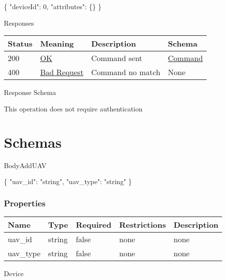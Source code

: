 \documentclass[
]{article}
\newenvironment{Shaded}{}{}
\newcommand{\DataTypeTok}[1]{\textcolor[rgb]{0.56,0.13,0.00}{#1}}
\newcommand{\DecValTok}[1]{\textcolor[rgb]{0.25,0.63,0.44}{#1}}
\newcommand{\FunctionTok}[1]{\textcolor[rgb]{0.02,0.16,0.49}{#1}}
\newcommand{\StringTok}[1]{\textcolor[rgb]{0.25,0.44,0.63}{#1}}
\begin{document}
\begin{Shaded}
\begin{Highlighting}[]
\FunctionTok{\{}
  \DataTypeTok{"deviceId"}\FunctionTok{:} \DecValTok{0}\FunctionTok{,}
  \DataTypeTok{"attributes"}\FunctionTok{:} \FunctionTok{\{\}}
\FunctionTok{\}}
\end{Highlighting}
\end{Shaded}

Responses

\begin{longtable}[]{@{}llll@{}}
\toprule
Status & Meaning & Description & Schema\tabularnewline
\midrule
\endhead
200 & \href{https://tools.ietf.org/html/rfc7231\#section-6.3.1}{OK} &
Command sent & \protect\hyperlink{schemacommand}{Command}\tabularnewline
400 & \href{https://tools.ietf.org/html/rfc7231\#section-6.5.1}{Bad
Request} & Command no match & None\tabularnewline
\bottomrule
\end{longtable}

Response Schema

This operation does not require authentication

\hypertarget{schemas}{%
\section{Schemas}\label{schemas}}

BodyAddUAV

\begin{Shaded}
\begin{Highlighting}[]
\FunctionTok{\{}
  \DataTypeTok{"uav\_id"}\FunctionTok{:} \StringTok{"string"}\FunctionTok{,}
  \DataTypeTok{"uav\_type"}\FunctionTok{:} \StringTok{"string"}
\FunctionTok{\}}
\end{Highlighting}
\end{Shaded}

\hypertarget{properties}{%
\subsubsection{Properties}\label{properties}}

\begin{longtable}[]{@{}lllll@{}}
\toprule
Name & Type & Required & Restrictions & Description\tabularnewline
\midrule
\endhead
uav\_id & string & false & none & none\tabularnewline
uav\_type & string & false & none & none\tabularnewline
\bottomrule
\end{longtable}

Device
\end{document}
